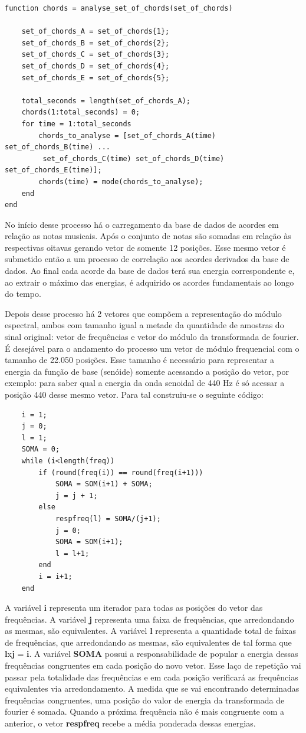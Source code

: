 \begin{lstlisting}
function chords = analyse_set_of_chords(set_of_chords)

	set_of_chords_A = set_of_chords{1};
	set_of_chords_B = set_of_chords{2};
	set_of_chords_C = set_of_chords{3};
	set_of_chords_D = set_of_chords{4};
	set_of_chords_E = set_of_chords{5};

	total_seconds = length(set_of_chords_A);
	chords(1:total_seconds) = 0;
	for time = 1:total_seconds
		chords_to_analyse = [set_of_chords_A(time) set_of_chords_B(time) ...
		 set_of_chords_C(time) set_of_chords_D(time) set_of_chords_E(time)];
		chords(time) = mode(chords_to_analyse);
	end
end
\end{lstlisting}

No início desse processo há o carregamento da base de dados de acordes em relação as notas musicais. Após o conjunto de notas são somadas em relação às respectivas oitavas gerando vetor de somente 12 posições. Esse mesmo vetor é submetido então a um processo de correlação aos acordes derivados da base de dados. Ao final cada acorde da base de dados terá sua energia correspondente e, ao extrair o máximo das energias, é adquirido os acordes fundamentais ao longo do tempo.


Depois desse processo há 2 vetores que compõem a representação do módulo espectral, ambos com tamanho igual a metade da quantidade de amostras do sinal original: vetor de frequências e vetor do módulo da transformada de fourier. É desejável para o andamento do processo um vetor de módulo frequencial com o tamanho de 22.050 posições. Esse tamanho é necessário para representar a energia da função de base (senóide) somente acessando a posição do vetor, por exemplo: para saber qual a energia da onda senoidal de 440 Hz é só acessar a posição 440 desse mesmo vetor. Para tal construiu-se o seguinte código:
\begin{lstlisting}
	i = 1;
	j = 0;
	l = 1;
	SOMA = 0;
	while (i<length(freq))
    	if (round(freq(i)) == round(freq(i+1)))
        	SOMA = SOM(i+1) + SOMA;
        	j = j + 1;
   	 	else
        	respfreq(l) = SOMA/(j+1);
        	j = 0;
        	SOMA = SOM(i+1);
        	l = l+1;
    	end
    	i = i+1;
	end
\end{lstlisting}

A variável \textbf{i} representa um iterador para todas as posições do vetor das frequências. A variável \textbf{j} representa uma faixa de frequências, que arredondando as mesmas, são equivalentes. A variável \textbf{l} representa a quantidade total de faixas de frequências, que arredondando as mesmas, são equivalentes de tal forma que \textbf{l}x\textbf{j} = \textbf{i}. A variável \textbf{SOMA} possui a responsabilidade de popular a energia dessas frequências congruentes em cada posição do novo vetor. Esse laço de repetição vai passar pela totalidade das frequências e em cada posição verificará as frequências equivalentes via arredondamento. A medida que se vai encontrando determinadas frequências congruentes, uma posição do valor de energia da transformada de fourier é somada. Quando a próxima frequência não é mais congruente com a anterior, o vetor \textbf{respfreq} recebe a média ponderada dessas energias.

